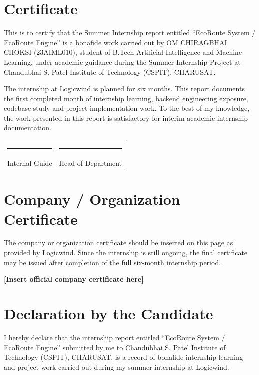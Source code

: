\documentclass[12pt,a4paper]{report}
\begin{document}
\chapter*{Certificate}
This is to certify that the Summer Internship report entitled ``EcoRoute System / EcoRoute Engine'' is a bonafide work carried out by OM CHIRAGBHAI CHOKSI (23AIML010), student of B.Tech Artificial Intelligence and Machine Learning, under academic guidance during the Summer Internship Project at Chandubhai S. Patel Institute of Technology (CSPIT), CHARUSAT.

The internship at Logicwind is planned for six months. This report documents the first completed month of internship learning, backend engineering exposure, codebase study and project implementation work. To the best of my knowledge, the work presented in this report is satisfactory for interim academic internship documentation.

\vspace{1.35in}
\begin{center}
\begin{tabular}{p{}p{}}
\centering\rule{2.3in}{0.4pt} & \centering\arraybackslash\rule{2.3in}{0.4pt}\\
\centering Internal Guide & \centering\arraybackslash Head of Department
\end{tabular}
\end{center}
\clearpage

\chapter*{Company / Organization Certificate}
The company or organization certificate should be inserted on this page as provided by Logicwind. Since the internship is still ongoing, the final certificate may be issued after completion of the full six-month internship period.

\vspace{2.0in}
\begin{center}\bfseries [Insert official company certificate here]\end{center}
\clearpage

\chapter*{Declaration by the Candidate}
I hereby declare that the internship report entitled ``EcoRoute System / EcoRoute Engine'' submitted by me to Chandubhai S. Patel Institute of Technology (CSPIT), CHARUSAT, is a record of bonafide internship learning and project work carried out during my summer internship at Logicwind.
\end{document}
